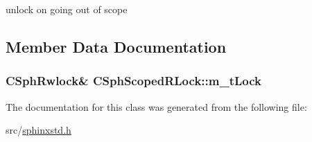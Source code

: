unlock on going out of scope 



\subsection{Member Data Documentation}
\hypertarget{classCSphScopedRLock_a18b614334ad1b2c861b5368c6665a518}{
\subsubsection[{m\-\_\-t\-Lock}]{\setlength{\rightskip}{0pt plus 5cm}C\-Sph\-Rwlock\& C\-Sph\-Scoped\-R\-Lock\-::m\-\_\-t\-Lock\hspace{0.3cm}{\ttfamily [protected]}}}\label{classCSphScopedRLock_a18b614334ad1b2c861b5368c6665a518}


The documentation for this class was generated from the following file\-:\begin{DoxyCompactItemize}
\item 
src/\hyperlink{sphinxstd_8h}{sphinxstd.\-h}\end{DoxyCompactItemize}
